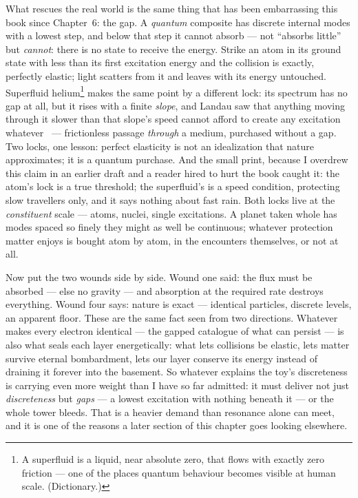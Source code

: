\documentclass[fontsize=11pt,paper=a4,pagesize=auto,parskip=half-]{scrbook}
\begin{document}
What rescues the real world is the same thing that has been embarrassing this book since Chapter~6: the gap. A \emph{quantum} composite has discrete internal modes with a lowest step, and below that step it cannot absorb --- not ``absorbs little'' but \emph{cannot}: there is no state to receive the energy. Strike an atom in its ground state with less than its first excitation energy and the collision is exactly, perfectly elastic; light scatters from it and leaves with its energy untouched. Superfluid helium\footnote{A superfluid is a liquid, near absolute zero, that flows with exactly zero friction --- one of the places quantum behaviour becomes visible at human scale. (Dictionary.)} makes the same point by a different lock: its spectrum has no gap at all, but it rises with a finite \emph{slope}, and Landau saw that anything moving through it slower than that slope's speed cannot afford to create any excitation whatever~\cite{pitaevskii2016} --- frictionless passage \emph{through} a medium, purchased without a gap. Two locks, one lesson: perfect elasticity is not an idealization that nature approximates; it is a quantum purchase. And the small print, because I overdrew this claim in an earlier draft and a reader hired to hurt the book caught it: the atom's lock is a true threshold; the superfluid's is a speed condition, protecting slow travellers only, and it says nothing about fast rain. Both locks live at the \emph{constituent} scale --- atoms, nuclei, single excitations. A planet taken whole has modes spaced so finely they might as well be continuous; whatever protection matter enjoys is bought atom by atom, in the encounters themselves, or not at all.

Now put the two wounds side by side. Wound one said: the flux must be absorbed --- else no gravity --- and absorption at the required rate destroys everything. Wound four says: nature is exact --- identical particles, discrete levels, an apparent floor. These are the same fact seen from two directions. Whatever makes every electron identical --- the gapped catalogue of what can persist --- is also what seals each layer energetically: what lets collisions be elastic, lets matter survive eternal bombardment, lets our layer conserve its energy instead of draining it forever into the basement. So whatever explains the toy's discreteness is carrying even more weight than I have so far admitted: it must deliver not just \emph{discreteness} but \emph{gaps} --- a lowest excitation with nothing beneath it --- or the whole tower bleeds. That is a heavier demand than resonance alone can meet, and it is one of the reasons a later section of this chapter goes looking elsewhere.
\end{document}
